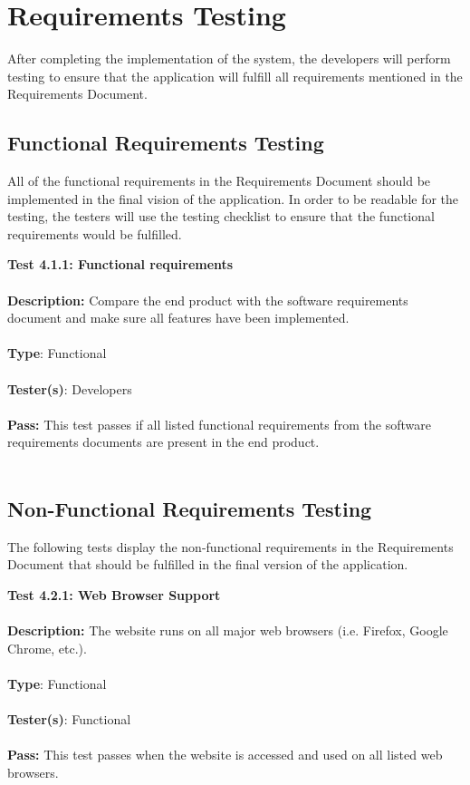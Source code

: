 \documentclass[12pt]{article}
\begin{document}
\section{Requirements Testing}
After completing the implementation of the system, the developers will perform testing to ensure that the application will fulfill all requirements mentioned in the Requirements Document.

\subsection{Functional Requirements Testing}
All of the functional requirements in the Requirements Document should be implemented in the final vision of the application. In order to be readable for the testing, the testers will use the testing checklist to ensure that the functional requirements would be fulfilled.

\begin{tcolorbox}
\textbf{Test 4.1.1: Functional requirements } \\ \\
\textbf{Description:} Compare the end product with the software requirements document and make sure all features have been implemented. \\ \\
\textbf{Type}: Functional \\ \\
\textbf{Tester(s)}: Developers \\ \\
\textbf{Pass:} This test passes if all listed functional requirements from the software requirements documents are present in the end product. \\ \\
\end{tcolorbox}

\subsection{Non-Functional Requirements Testing}
The following tests display the non-functional requirements in the Requirements Document that should be fulfilled in the final version of the application. 

\begin{tcolorbox}
\textbf{Test 4.2.1: Web Browser Support} \\ \\
\textbf{Description:} The website runs on all major web browsers (i.e. Firefox, Google Chrome, etc.). \\ \\
\textbf{Type}: Functional \\ \\
\textbf{Tester(s)}: Functional \\ \\
\textbf{Pass:} This test passes when the website is accessed and used on all listed web browsers. \\ \\
\end{tcolorbox}
\end{document}

